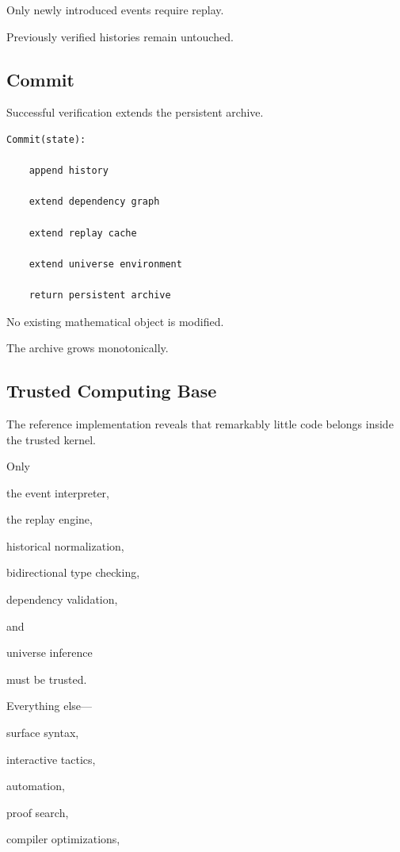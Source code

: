 \documentclass[12pt,oneside]{article}
\theoremstyle{definition}
\theoremstyle{remark}
\begin{document}
Only newly introduced events require replay.

Previously verified histories remain untouched.


\subsection{Commit}

Successful verification extends the persistent archive.

\begin{verbatim}
Commit(state):

    append history

    extend dependency graph

    extend replay cache

    extend universe environment

    return persistent archive
\end{verbatim}

No existing mathematical object is modified.

The archive grows monotonically.


\subsection{Trusted Computing Base}

The reference implementation reveals that remarkably little code belongs inside
the trusted kernel.

Only

the event interpreter,

the replay engine,

historical normalization,

bidirectional type checking,

dependency validation,

and

universe inference

must be trusted.

Everything else—

surface syntax,

interactive tactics,

automation,

proof search,

compiler optimizations,
\end{document}
